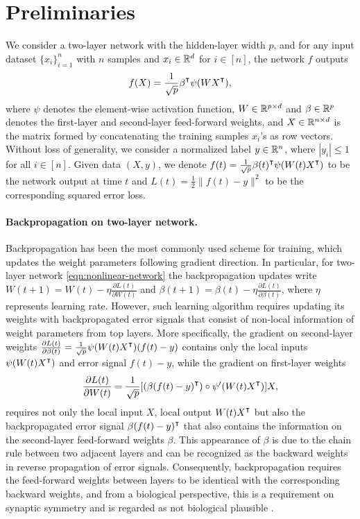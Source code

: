 \section{Preliminaries}

We consider a two-layer network with the hidden-layer width $p$, and for any input dataset $\{x_i\}_{i=1}^n$ with $n$ samples and $x_i\in{\mathbb{R}^{d}}$ for $i\in[n]$, the network $f$ outputs 
\begin{align}\label{eqn:nonlinear-network}
    f(X) = \frac{1}{\sqrt p}\beta\transpose\psi(WX\transpose),
\end{align}
where $\psi$ denotes the element-wise activation function, $W\in{\mathbb{R}^{p\times d}}$ and $\beta\in{\mathbb{R}^{p}}$ denotes the first-layer and second-layer feed-forward weights, and $X\in{\mathbb{R}^{n\times d}}$ is the matrix formed by concatenating the training samples $x_i$'s as row vectors. 
Without loss of generality, we consider a normalized label $y\in{\mathbb{R}^n}$, where $|y_i|\leq 1$ for all $i\in[n]$.
Given data $(X,y)$, we denote $f(t) = \frac{1}{\sqrt p}\beta(t)\transpose\psi(W(t)X\transpose)$ to be the network output at time $t$ and $L(t) = \frac{1}{2}\|f(t)-y\|^2$ to be the corresponding squared error loss.

\paragraph{Backpropagation on two-layer network.}

Backpropagation has been the most commonly used scheme for training, which updates the weight parameters following gradient direction. In particular, for two-layer network \eqref{eqn:nonlinear-network} the backpropagation updates write $W(t+1) = W(t) - \eta \frac{\partial L(t)}{\partial W(t)}$ and $\beta(t+1) = \beta(t) - \eta \frac{\partial L(t)}{\partial \beta(t)}$, where $\eta$ represents learning rate. However, such learning algorithm requires updating its weights with backpropagated error signals that consist of non-local information of weight parameters from top layers. More specifically, the gradient on second-layer weights $\frac{\partial L(t)}{\partial \beta(t)} = \frac{1}{\sqrt{p}} \psi(W(t) X\transpose) (f(t) - y)$ contains only the local inputs $\psi(W(t) X\transpose)$ and error signal $f(t) - y$, while the gradient on first-layer weights 
\begin{align}\label{eqn:backprop-gradient}
    \frac{\partial L(t)}{\partial W(t)} = \frac{1}{\sqrt{p}} [(\beta (f(t) - y)\transpose)\circ \psi'(W(t)X\transpose)] X,
\end{align}
requires not only the local input $X$, local output $W(t)X\transpose$ but also the backpropagated error signal $\beta (f(t) - y)\transpose$ that also contains the information on the second-layer feed-forward weights $\beta$. This appearance of $\beta$ is due to the chain rule between two adjacent layers and can be recognized as the backward weights in reverse propagation of error signals.
Consequently, backpropagation requires the feed-forward weights between layers to be identical with the corresponding backward weights, and from a biological perspective, this is a requirement on synaptic symmetry and is regarded as not biological plausible \citep{lillicrap2016random}. 

